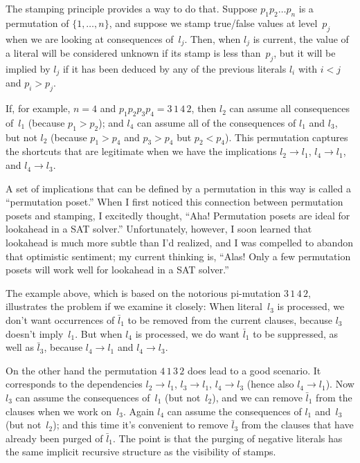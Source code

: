 The stamping principle provides a way to do that. Suppose $p_1p_2\ldots p_n$
is a permutation of $\{1,\ldots,n\}$, and suppose we stamp true/false values
at level~$p_j$ when we are looking at consequences of~$l_j$. Then, when
$l_j$ is current, the value of a literal will be considered unknown if its
stamp is less than~$p_j$, but it will be implied by $l_j$ if it has been
deduced by any of the previous literals $l_i$ with $i<j$ and $p_i>p_j$.

If, for example, $n=4$ and $p_1p_2p_3p_4=3\,1\,4\,2$, then $l_2$
can assume all consequences of~$l_1$ (because $p_1>p_2$); and $l_4$ can
assume all of the consequences of $l_1$ and $l_3$, but not $l_2$
(because $p_1>p_4$ and $p_3>p_4$ but $p_2<p_4$). This permutation
captures the shortcuts that are legitimate when we have the
implications $l_2\to l_1$, $l_4\to l_1$, and $l_4\to l_3$.

A set of implications that can be defined by a permutation in this way is
called a ``permutation poset.'' When I first noticed this connection between
permutation posets and stamping, I excitedly thought, ``Aha! Permutation
posets are ideal for lookahead in a {\mc SAT} solver.'' Unfortunately,
however, I soon learned that lookahead is much more subtle than I'd
realized, and I was compelled to abandon that optimistic sentiment;
my current thinking is, ``Alas! Only a few permutation posets will work
well for lookahead in a {\mc SAT} solver.''

The example above, which is based on the notorious pi-mutation $3\,1\,4\,2$,
illustrates the problem if we examine it closely: When literal~$l_3$ is
processed, we don't want occurrences of $\bar l_1$ to be removed from the
current clauses, because $l_3$ doesn't imply~$l_1$. But when $l_4$ is
processed, we do want $\bar l_1$ to be suppressed, as well as $\bar l_3$,
because $l_4\to l_1$ and $l_4\to l_3$.

On the other hand the permutation $4\,1\,3\,2$ does lead to a good scenario.
It corresponds to the dependencies $l_2\to l_1$, $l_3\to l_1$, $l_4\to l_3$
(hence also $l_4\to l_1$). Now $l_3$ can assume the consequences of~$l_1$
(but not~$l_2$), and we can remove $\bar l_1$ from the clauses when we work
on~$l_3$. Again $l_4$ can assume the consequences of $l_1$ and~$l_3$ (but
not~$l_2$); and this time it's convenient to remove $\bar l_3$ from the
clauses that have already been purged of $\bar l_1$. The point is that
the purging of negative literals has the same implicit recursive structure
as the visibility of stamps.


